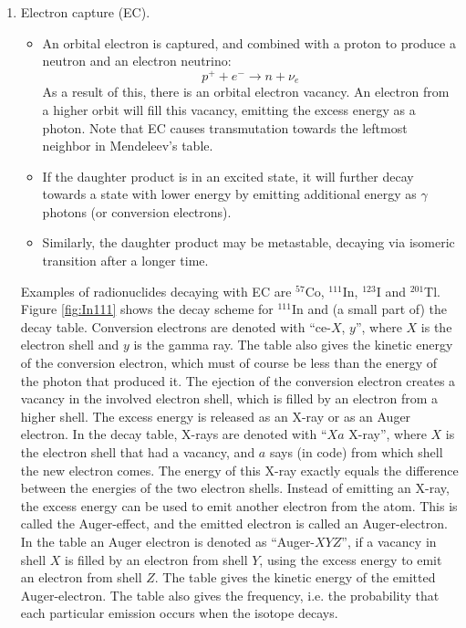 \documentclass[11pt,oneside]{book}
\begin{document}
\begin{enumerate}
\item Electron capture (EC).
\begin{itemize}
\item An orbital electron is captured, and combined with a proton to produce a
neutron and an electron neutrino:
\begin{equation}
  p^+ + e^- \rightarrow n + \nu_e
\end{equation}
As a result of this, there is an orbital electron vacancy.  An electron from a
higher orbit will fill this vacancy, emitting the excess energy as a photon.
Note that EC causes transmutation towards the leftmost neighbor in
Mendeleev's table.

\item If the daughter product is in an excited state, it will further decay
towards a state with lower energy by emitting additional energy as $\gamma$
photons (or conversion electrons).

\item
Similarly, the daughter product may be metastable, decaying via isomeric
transition after a longer time.
\end{itemize}

Examples of radionuclides decaying with EC are $^{57}$Co, $^{111}$In,
$^{123}$I and $^{201}$Tl. Figure \ref{fig:In111} shows the decay
scheme for $^{111}$In and (a small part of) the decay
table. Conversion electrons are denoted with ``ce-$X$, $y$'', where
$X$ is the electron shell and $y$ is the gamma ray. The table also
gives the kinetic energy of the conversion electron, which must of
course be less than the energy of the photon that produced it. The
ejection of the conversion electron creates a vacancy in the involved
electron shell, which is filled by an electron from a higher
shell. The excess energy is released as an X-ray or as an Auger
electron. In the decay table, X-rays are denoted with ``$Xa$ X-ray'',
where $X$ is the electron shell that had a vacancy, and $a$ says (in
code) from which shell the new electron comes. The energy of this
X-ray exactly equals the difference between the energies of the two
electron shells.  Instead of emitting an X-ray, the excess energy can
be used to emit another electron from the atom. This is called the
Auger-effect, and the emitted electron is called an Auger-electron. In
the table an Auger electron is denoted as ``Auger-$XYZ$'', if a
vacancy in shell $X$ is filled by an electron from shell $Y$, using
the excess energy to emit an electron from shell $Z$. The table gives
the kinetic energy of the emitted Auger-electron. The table also gives
the frequency, i.e. the probability that each particular emission
occurs when the isotope decays.
%


\end{enumerate}
\end{document}

